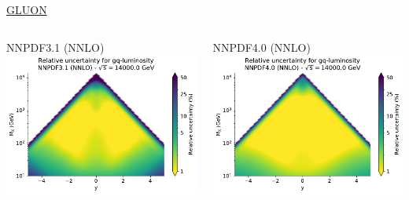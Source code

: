 \documentclass{beamer}
\begin{document}
\begin{frame}
\begin{overlayarea}{\textwidth}{5.2cm}
{\begin{columns}[c]
\begin{column}{0.5\textwidth}
   \end{column}
  \end{columns}  
  } 
  {
  \centering
  \underline{GLUON}\\
  \begin{columns}[c]
   \begin{column}{0.5\textwidth}
    \centering
        NNPDF3.1 (NNLO)\\
        \vspace{0.1cm}
        \includegraphics[width=\columnwidth]{plots/plot_lumi2d_uncertainty_NNPDF31_gq}\\
   \end{column}
   \begin{column}{0.5\textwidth}
    \centering
        NNPDF4.0 (NNLO)\\
        \vspace{0.1cm}
        \includegraphics[width=\columnwidth]{plots/plot_lumi2d_uncertainty_NNPDF40_gq}\\    

\end{column}
\end{columns}}
\end{overlayarea}
\end{frame}
\end{document}
